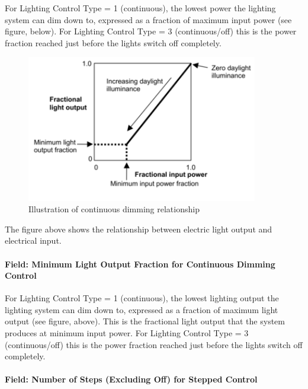For Lighting Control Type = 1 (continuous), the lowest power the lighting system can dim down to, expressed as a fraction of maximum input power (see figure, below). For Lighting Control Type = 3 (continuous/off) this is the power fraction reached just before the lights switch off completely.

\begin{figure}[hbtp] %
\centering
\includegraphics[width=0.9\textwidth, height=0.9\textheight, keepaspectratio=true]{media/image105.png}
\caption{Illustration of continuous dimming relationship \protect \label{fig:illustration-of-continuous-dimming-001}}
\end{figure}

The figure above shows the relationship between electric light output and electrical input.

\paragraph{Field: Minimum Light Output Fraction for Continuous Dimming Control}\label{field-minimum-light-output-fraction-for-continuous-dimming-control-1}

For Lighting Control Type = 1 (continuous), the lowest lighting output the lighting system can dim down to, expressed as a fraction of maximum light output (see figure, above). This is the fractional light output that the system produces at minimum input power. For Lighting Control Type = 3 (continuous/off) this is the power fraction reached just before the lights switch off completely.

\paragraph{Field: Number of Steps (Excluding Off) for Stepped Control}\label{field-number-of-steps-excluding-off-for-stepped-control}

